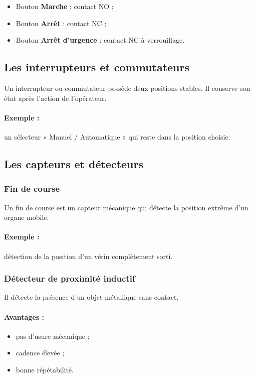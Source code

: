 \begin{itemize}
    \item Bouton \textbf{Marche} : contact NO ;
    \item Bouton \textbf{Arrêt} : contact NC ;
    \item Bouton \textbf{Arrêt d'urgence} : contact NC à verrouillage.
\end{itemize}

\subsection{Les interrupteurs et commutateurs}

Un interrupteur ou commutateur possède deux positions stables. Il conserve son état après l'action de l'opérateur.

\paragraph{Exemple :} un sélecteur « Manuel / Automatique » qui reste dans la position choisie.

\subsection{Les capteurs et détecteurs}

\subsubsection{Fin de course}

Un fin de course est un capteur mécanique qui détecte la position extrême d'un organe mobile.

\paragraph{Exemple :} détection de la position d'un vérin complètement sorti.

\subsubsection{Détecteur de proximité inductif}

Il détecte la présence d'un objet métallique sans contact.

\paragraph{Avantages :}
\begin{itemize}
    \item pas d'usure mécanique ;
    \item cadence élevée ;
    \item bonne répétabilité.
\end{itemize}

